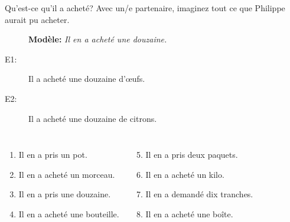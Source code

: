 \begin{frame}{Qu'est-ce qu'il a acheté?}
  Avec un/e partenaire, imaginez tout ce que Philippe aurait pu acheter.\\
  \begin{description}
    \item[] \textbf{Modèle:} \emph{Il en a acheté une douzaine.}
    \item[E1:] Il a acheté une douzaine d'œufs.
    \item[E2:] Il a acheté une douzaine de citrons.
  \end{description}
  \begin{columns}
      \begin{enumerate}
        \item Il en a pris un pot.
        \item Il en a acheté un morceau.
        \item Il en a pris une douzaine.
        \item Il en a acheté une bouteille.
      \end{enumerate}
      \begin{enumerate}
        \setcounter{enumi}{4}
        \item Il en a pris deux paquets.
        \item Il en a acheté un kilo.
        \item Il en a demandé dix tranches.
        \item Il en a acheté une boîte.
      \end{enumerate}
  \end{columns}
\end{frame}